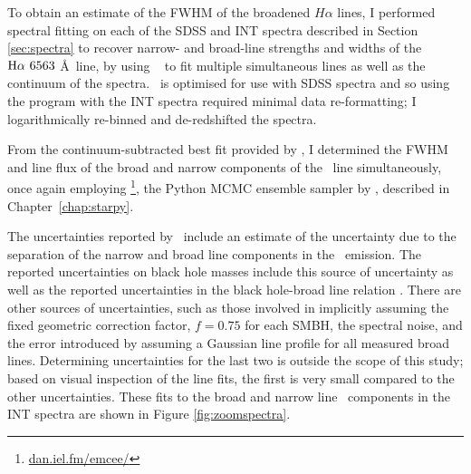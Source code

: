 To obtain an estimate of the FWHM of the broadened $H\alpha$ lines, I performed spectral fitting on each of the SDSS and INT spectra described in Section \ref{sec:spectra} to recover narrow- and broad-line strengths and widths of the $\mha\ 6563$ \AA\ line, by using \gandalf\ \citep{sarzi06} {\notebsm to fit multiple simultaneous lines as well as the continuum of the spectra}. \gandalf\ is optimised for use with SDSS spectra and so using the program with the INT spectra required minimal data re-formatting; I logarithmically re-binned and de-redshifted the spectra. {\notebsm From the continuum-subtracted best fit provided by \gandalf, I determined the FWHM and line flux of the broad and narrow components of the \ha\ line simultaneously, once again employing \emcee\footnote{\url{dan.iel.fm/emcee/}}, the Python MCMC ensemble sampler by \cite{emcee13}, described in Chapter~\ref{chap:starpy}. 

The uncertainties reported by \emcee\ include an estimate of the uncertainty due to the separation of the narrow and broad line components in the \ha\ emission. The reported uncertainties on black hole masses include this source of uncertainty as well as the reported uncertainties in the black hole-broad line relation \citep{gh07a}. There are other sources of uncertainties, such as those involved in implicitly assuming the fixed geometric correction factor, $f=0.75$ \citep{netzer90} for each SMBH, the spectral noise, and the error introduced by assuming a Gaussian line profile for all measured broad lines. Determining uncertainties for the last two is outside the scope of this study; based on visual inspection of the line fits, the first is very small compared to the other uncertainties. These fits to the broad and narrow line \ha \ components in the INT spectra are shown in Figure \ref{fig:zoomspectra}.

}
